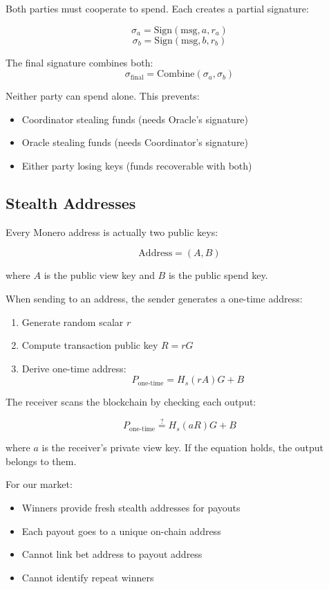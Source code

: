 \documentclass{article}
\begin{document}
Both parties must cooperate to spend. Each creates a partial signature:

$$\sigma_a = \text{Sign}(\text{msg}, a, r_a)$$
$$\sigma_b = \text{Sign}(\text{msg}, b, r_b)$$

The final signature combines both:
$$\sigma_{\text{final}} = \text{Combine}(\sigma_a, \sigma_b)$$

Neither party can spend alone. This prevents:

\begin{itemize}
\item Coordinator stealing funds (needs Oracle's signature)

\item Oracle stealing funds (needs Coordinator's signature)

\item Either party losing keys (funds recoverable with both)

\end{itemize}

\subsection{Stealth Addresses}

Every Monero address is actually two public keys:

$$\text{Address} = (A, B)$$

where $A$ is the public view key and $B$ is the public spend key.

When sending to an address, the sender generates a one-time address:

\begin{enumerate}
\item Generate random scalar $r$

\item Compute transaction public key $R = rG$

\item Derive one-time address:
$$P_{\text{one-time}} = H_s(rA)G + B$$

\end{enumerate}

The receiver scans the blockchain by checking each output:

$$P_{\text{one-time}} \stackrel{?}{=} H_s(aR)G + B$$

where $a$ is the receiver's private view key. If the equation holds, the output belongs to them.

For our market:

\begin{itemize}
\item Winners provide fresh stealth addresses for payouts

\item Each payout goes to a unique on-chain address

\item Cannot link bet address to payout address

\item Cannot identify repeat winners

\end{itemize}
\end{document}

